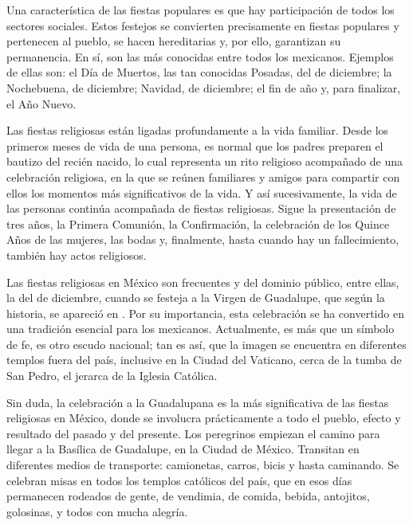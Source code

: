 \documentclass[14pt,letterpaper,twoside]{extbook} %
\begin{document}
\noindent Una característica de las fiestas populares es que hay participación de todos los sectores sociales. Estos festejos se convierten precisamente en fiestas populares y pertenecen al pueblo, se hacen hereditarias y, por ello, garantizan su permanencia. En sí, son las más conocidas entre todos los mexicanos. Ejemplos de ellas son: el Día de Muertos, las tan conocidas Posadas, del  de diciembre; la Nochebuena,  de diciembre; Navidad,  de diciembre; el fin de año y, para finalizar, el Año Nuevo.

Las fiestas religiosas están ligadas profundamente a la vida familiar. Desde los primeros meses de vida de una persona, es normal que los padres preparen el bautizo del recién nacido, lo cual representa un rito religioso acompañado de una celebración religiosa, en la que se reúnen familiares y amigos para compartir con ellos los momentos más significativos de la vida. Y así sucesivamente, la vida de las personas continúa acompañada de fiestas religiosas. Sigue la presentación de tres años, la Primera Comunión, la Confirmación, la celebración de los Quince Años de las mujeres, las bodas y, finalmente, hasta cuando hay un fallecimiento, también hay actos religiosos.

Las fiestas religiosas en México son frecuentes y del dominio público, entre ellas, la del  de diciembre, cuando se festeja a la Virgen de Guadalupe, que según la historia, se apareció en . Por su importancia, esta celebración se ha convertido en una tradición esencial para los mexicanos. Actualmente, es más que un símbolo de fe, es otro escudo nacional; tan es así, que la imagen se encuentra en diferentes templos fuera del país, inclusive en la Ciudad del Vaticano, cerca de la tumba de San Pedro, el jerarca de la Iglesia Católica.

Sin duda, la celebración a la Guadalupana es la más significativa de las fiestas religiosas en México, donde se involucra prácticamente a todo el pueblo, efecto y resultado del pasado y del presente. Los peregrinos empiezan el camino para llegar a la Basílica de Guadalupe, en la Ciudad de México. Transitan en diferentes medios de transporte: camionetas, carros, bicis y hasta caminando. Se celebran misas en todos los templos católicos del país, que en esos días permanecen rodeados de gente, de vendimia, de comida, bebida, antojitos, golosinas, y todos con mucha alegría.
\end{document}
